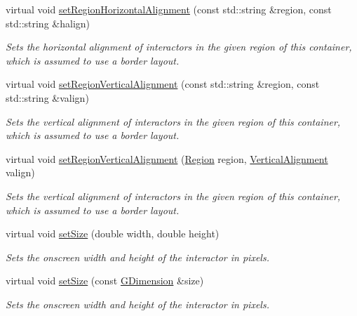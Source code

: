 \begin{DoxyCompactItemize}
virtual void \mbox{\hyperlink{classsgl_1_1GContainer_aefb97090ff4e149f8a0cce9efee3c451}{set\+Region\+Horizontal\+Alignment}} (const std\+::string \&region, const std\+::string \&halign)
\begin{DoxyCompactList}\small\item\em Sets the horizontal alignment of interactors in the given region of this container, which is assumed to use a border layout. \end{DoxyCompactList}\item 
virtual void \mbox{\hyperlink{classsgl_1_1GContainer_afbe22d897ce8ef25db52cbc3d456aa0a}{set\+Region\+Vertical\+Alignment}} (const std\+::string \&region, const std\+::string \&valign)
\begin{DoxyCompactList}\small\item\em Sets the vertical alignment of interactors in the given region of this container, which is assumed to use a border layout. \end{DoxyCompactList}\item 
virtual void \mbox{\hyperlink{classsgl_1_1GContainer_a1efb2d3b67fb479aad27a6c0032ee70e}{set\+Region\+Vertical\+Alignment}} (\mbox{\hyperlink{classsgl_1_1GContainer_a81a01a86de31071a92e6cce0bab9bc4b}{Region}} region, \mbox{\hyperlink{namespacesgl_a9c2ed22cfbd21f13df24ea193b310aee}{Vertical\+Alignment}} valign)
\begin{DoxyCompactList}\small\item\em Sets the vertical alignment of interactors in the given region of this container, which is assumed to use a border layout. \end{DoxyCompactList}\item 
virtual void \mbox{\hyperlink{classsgl_1_1GInteractor_aca25d49481f9bf5fc8f7df4c086c4ce7}{set\+Size}} (double width, double height)
\begin{DoxyCompactList}\small\item\em Sets the onscreen width and height of the interactor in pixels. \end{DoxyCompactList}\item 
virtual void \mbox{\hyperlink{classsgl_1_1GInteractor_ae2b628228f192c2702c4ce941b2af68f}{set\+Size}} (const \mbox{\hyperlink{structsgl_1_1GDimension}{G\+Dimension}} \&size)
\begin{DoxyCompactList}\small\item\em Sets the onscreen width and height of the interactor in pixels. \end{DoxyCompactList}\item 

\end{DoxyCompactItemize}
